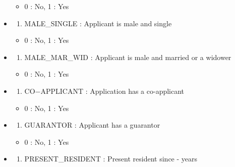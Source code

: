 \documentclass[
]{article}
\providecommand{\tightlist}{%
  \setlength{\itemsep}{0pt}\setlength{\parskip}{0pt}}
\begin{document}
\begin{itemize}
  \begin{itemize}
  \tightlist
  \item
    0 : No, 1 : Yes
  \end{itemize}
\item
  \begin{enumerate}
  \def\labelenumi{\arabic{enumi})}
  \setcounter{enumi}{15}
  \tightlist
  \item
    MALE\_SINGLE : Applicant is male and single
  \end{enumerate}

  \begin{itemize}
  \tightlist
  \item
    0 : No, 1 : Yes
  \end{itemize}
\item
  \begin{enumerate}
  \def\labelenumi{\arabic{enumi})}
  \setcounter{enumi}{16}
  \tightlist
  \item
    MALE\_MAR\_WID : Applicant is male and married or a widower
  \end{enumerate}

  \begin{itemize}
  \tightlist
  \item
    0 : No, 1 : Yes
  \end{itemize}
\item
  \begin{enumerate}
  \def\labelenumi{\arabic{enumi})}
  \setcounter{enumi}{17}
  \tightlist
  \item
    CO−APPLICANT : Application has a co-applicant
  \end{enumerate}

  \begin{itemize}
  \tightlist
  \item
    0 : No, 1 : Yes
  \end{itemize}
\item
  \begin{enumerate}
  \def\labelenumi{\arabic{enumi})}
  \setcounter{enumi}{18}
  \tightlist
  \item
    GUARANTOR : Applicant has a guarantor
  \end{enumerate}

  \begin{itemize}
  \tightlist
  \item
    0 : No, 1 : Yes
  \end{itemize}
\item
  \begin{enumerate}
  \def\labelenumi{\arabic{enumi})}
  \setcounter{enumi}{19}
  \tightlist
  \item
    PRESENT\_RESIDENT : Present resident since - years
  \end{enumerate}


\end{itemize}
\end{document}
